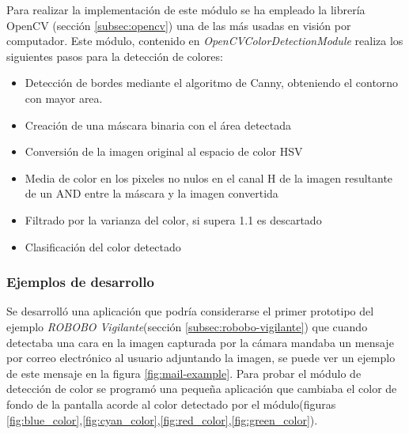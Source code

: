Para realizar la implementación de este módulo se ha empleado la librería OpenCV\cite{itseez2015opencv} (sección \ref{subsec:opencv}) una de las más usadas en visión por computador. Este módulo, contenido en \textit{OpenCVColorDetectionModule} realiza los siguientes pasos para la detección de colores:
\begin{itemize}
	\item Detección de bordes mediante el algoritmo de Canny, obteniendo el contorno con mayor area.
	\item Creación de una máscara binaria con el área detectada
	\item Conversión de la imagen original al espacio de color HSV
	\item Media de color en los pixeles no nulos en el canal H de la imagen resultante de un AND entre la máscara y la imagen convertida
	\item Filtrado por la varianza del color, si supera 1.1 es descartado
	\item Clasificación del color detectado
\end{itemize}

\subsubsection*{Ejemplos de desarrollo}

Se desarrolló una aplicación que podría considerarse el primer prototipo del ejemplo \textit{ROBOBO Vigilante}(sección \ref{subsec:robobo-vigilante}) que cuando detectaba una cara en la imagen capturada por la cámara mandaba un mensaje por correo electrónico al usuario adjuntando la imagen, se puede ver un ejemplo de este mensaje en la figura \ref{fig:mail-example}.
Para probar el módulo de detección de color se programó una pequeña aplicación que cambiaba el color de fondo de la pantalla acorde al color detectado por el módulo(figuras \ref{fig:blue_color},\ref{fig:cyan_color},\ref{fig:red_color},\ref{fig:green_color}).

